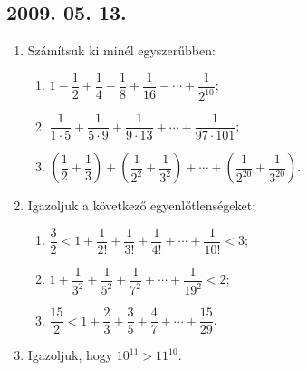 \documentclass{article}
\newenvironment{abc}{\begin{enumerate}[label=\textit{\alph*})]}{\end{enumerate}}
\begin{document}
\subsection*{2009. 05. 13.}
\begin{enumerate}

\item Számítsuk ki minél egyszerűbben:
\begin{abc}
\item $1-\dfrac{1}{2}+\dfrac{1}{4}-\dfrac{1}{8}+\dfrac{1}{16}-\cdots+\dfrac{1}{2^{10}}$;
\item $\dfrac{1}{1\cdot5}+\dfrac{1}{5\cdot9}+\dfrac{1}{9\cdot13}+\cdots+\dfrac{1}{97\cdot101}$;
\item $\left(\dfrac{1}{2}+\dfrac{1}{3}\right)+\left(\dfrac{1}{2^2}+\dfrac{1}{3^2}\right)+\cdots+\left(\dfrac{1}{2^{20}}+\dfrac{1}{3^{20}}\right)$.
\end{abc}
\item Igazoljuk a következő egyenlőtlenségeket:
\begin{abc}
\item $ \dfrac{3}{2}<1+\dfrac{1}{2!}+\dfrac{1}{3!}+\dfrac{1}{4!}+\cdots+\dfrac{1}{10!}<3$;
\item $1+\dfrac{1}{3^2}+\dfrac{1}{5^2}+\dfrac{1}{7^2}+\cdots+\dfrac{1}{19^2}<2$;
\item $\dfrac{15}{2}<1+\dfrac{2}{3}+\dfrac{3}{5}+\dfrac{4}{7}+\cdots+\dfrac{15}{29}$.
\end{abc}

\item Igazoljuk, hogy $10^{11}>11^{10}$.
\end{enumerate}
\end{document}
